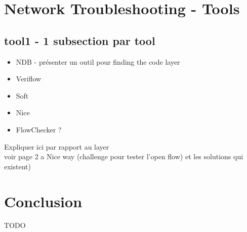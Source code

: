 \documentclass[10pt,article]{IEEEtran}
\begin{document}
\section{Network Troubleshooting - Tools}

\subsection{tool1 - 1 subsection par tool}
\begin{itemize}
\item NDB - présenter un outil pour finding the code layer
\item Veriflow
\item Soft
\item Nice
\item FlowChecker ?
\end{itemize}
Expliquer ici par rapport au layer\\

voir page 2 a Nice way (challenge pour tester l'open flow) et les solutions qui existent)


\section{Conclusion}
TODO
\nocite{*}


\end{document}
